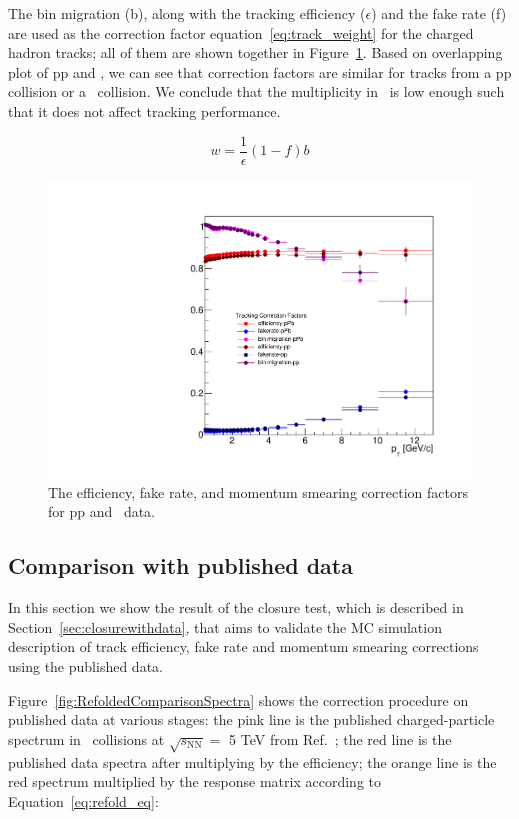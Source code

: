 The bin migration (b), along with the tracking efficiency ($\epsilon$) and the fake rate (f) are used as the correction factor equation~\ref{eq:track_weight} for the charged hadron tracks; all of them are shown together in Figure~\ref{fig:correctionFactors}. Based on overlapping plot of pp and \pPb, we can see that correction factors are similar for tracks from a pp collision or a \pPb~collision. We conclude that the multiplicity in \pPb~is low enough such that it does not affect tracking performance.  

\begin{equation}\label{eq:track_weight}
w = \frac{1}{\epsilon}(1-f)b
\end{equation}

\begin{figure}[h]
\center
\includegraphics[width=.5\textwidth]{Data_Analysis/Tracking/trackCorrectionFactors_pPbAndpp.pdf}
\caption{The efficiency, fake rate, and momentum smearing correction factors for pp and \pPb~data.}
\label{fig:correctionFactors}
\end{figure}

\subsection{Comparison with published data}
In this section we show the result of the closure test, which is described in Section~\ref{sec:closurewithdata}, that aims to validate the MC simulation description of track efficiency, fake rate and momentum smearing corrections using the published data. 

Figure~\ref{fig:RefoldedComparisonSpectra} shows the correction procedure on published data at various stages: the pink line is the published charged-particle spectrum in \pPb~collisions at {$\sqrt{s_{\mathrm{NN}}}=$ 5 TeV} from Ref.~\cite{Acharya:2018qsh}; the red line is the published data spectra after multiplying by the efficiency; the orange line is the red spectrum multiplied by the response matrix according to Equation~\ref{eq:refold_eq}:

